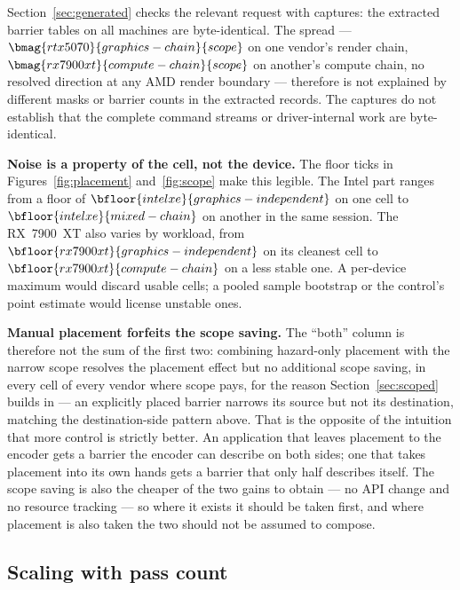 \documentclass[10pt,twocolumn]{article}
\begin{document}
Section~\ref{sec:generated} checks the relevant request with captures: the
extracted barrier tables on all  machines are
byte-identical. The spread --- $\bmag{rtx5070}{graphics-chain}{scope}$ on one
vendor's render chain, $\bmag{rx7900xt}{compute-chain}{scope}$ on another's
compute chain, no resolved direction at any AMD render boundary --- therefore
is not explained by different masks or barrier counts in the extracted
records. The captures do not establish that the complete command streams or
driver-internal work are byte-identical.

\textbf{Noise is a property of the cell, not the device.} The floor ticks in
Figures~\ref{fig:placement} and~\ref{fig:scope} make this legible. The Intel
part ranges from a floor of
$\bfloor{intelxe}{graphics-independent}$ on one cell to
$\bfloor{intelxe}{mixed-chain}$ on another in the same session. The
RX~7900~XT also varies by workload,
from $\bfloor{rx7900xt}{graphics-independent}$ on its cleanest cell to
$\bfloor{rx7900xt}{compute-chain}$ on a less stable one. A per-device maximum
would discard usable cells; a pooled sample bootstrap or the control's point
estimate would license unstable ones.

\textbf{Manual placement forfeits the scope saving.} The ``both'' column is
therefore not the sum of the first two: combining hazard-only placement with
the narrow scope resolves the placement effect but no additional scope saving,
in every cell of every vendor where scope pays, for the reason
Section~\ref{sec:scoped} builds in --- an explicitly placed barrier narrows
its source but not its destination, matching the destination-side pattern
above.
That is the opposite of the intuition that more control is strictly better. An
application that leaves placement to the encoder gets a barrier the encoder
can describe on both sides; one that takes placement into its own hands gets a
barrier that only half describes itself. The scope saving is also the cheaper
of the two gains to obtain --- no API change and no resource tracking --- so
where it exists it should be taken first, and where placement is also taken
the two should not be assumed to compose.

\subsection{Scaling with pass count}



\end{document}
